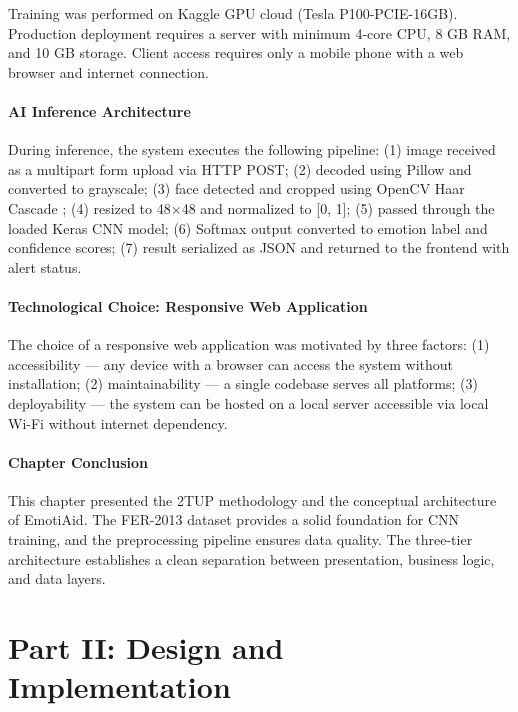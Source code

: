 \documentclass[a4paper,12pt,oneside]{report}
\begin{document}
Training was performed on Kaggle GPU cloud (Tesla P100-PCIE-16GB). Production
deployment requires a server with minimum 4-core CPU, 8 GB RAM, and 10 GB storage.
Client access requires only a mobile phone with a web browser and internet
connection.

\subsection{AI Inference Architecture}

During inference, the system executes the following pipeline: (1) image received
as a multipart form upload via HTTP POST; (2) decoded using Pillow and converted
to grayscale; (3) face detected and cropped using OpenCV Haar Cascade
\cite{viola2001}; (4) resized to 48$\times$48 and normalized to [0, 1]; (5) passed
through the loaded Keras CNN model; (6) Softmax output converted to emotion label
and confidence scores; (7) result serialized as JSON and returned to the frontend
with alert status.

\subsection{Technological Choice: Responsive Web Application}

The choice of a responsive web application was motivated by three factors:
(1) accessibility --- any device with a browser can access the system without
installation; (2) maintainability --- a single codebase serves all platforms;
(3) deployability --- the system can be hosted on a local server accessible via
local Wi-Fi without internet dependency.

\subsection*{Chapter Conclusion}

This chapter presented the 2TUP methodology and the conceptual architecture of
EmotiAid. The FER-2013 dataset provides a solid foundation for CNN training, and
the preprocessing pipeline ensures data quality. The three-tier architecture
establishes a clean separation between presentation, business logic, and data
layers.

\clearpage

\part*{Part II: Design and Implementation}
\end{document}

